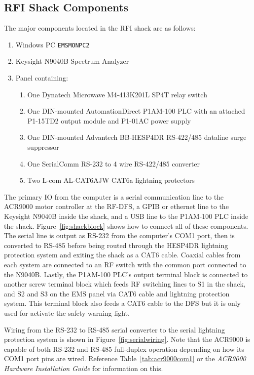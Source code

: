 \documentclass[titlepage]{article}
\begin{document}
\subsection{RFI Shack Components}\label{sec:higshack}
The major components located in the RFI shack are as follows:
\begin{enumerate}
  \item Windows PC \verb|EMSMONPC2|
  \item Keysight N9040B Spectrum Analyzer
  \item Panel containing:
  \begin{enumerate}
    \item One Dynatech Microwave M4-413K201L SP4T relay switch
    \item One DIN-mounted AutomationDirect P1AM-100 PLC with an attached P1-15TD2 output module and P1-01AC power supply
    \item One DIN-mounted Advantech BB-HESP4DR RS-422/485 dataline surge suppressor
    \item One SerialComm RS-232 to 4 wire RS-422/485 converter
    \item Two L-com AL-CAT6AJW CAT6a lightning protectors
  \end{enumerate}
\end{enumerate}

The primary IO from the computer is a serial communication line to the ACR9000 motor controller at the RF-DFS, a GPIB or ethernet line to the Keysight N9040B inside the shack, and a USB line to the P1AM-100 PLC inside the shack. Figure~\ref{fig:shackblock} shows how to connect all of these components. The serial line is output as RS-232 from the computer's COM1 port, then is converted to RS-485 before being routed through the HESP4DR lightning protection system and exiting the shack as a CAT6 cable. Coaxial cables from each system are connected to an RF switch with the common port connected to the N9040B. Lastly, the P1AM-100 PLC's output terminal block is connected to another screw terminal block which feeds RF switching lines to S1 in the shack, and S2 and S3 on the EMS panel via CAT6 cable and lightning protection system. This terminal block also feeds a CAT6 cable to the DFS but it is only used for activate the safety warning light.

Wiring from the RS-232 to RS-485 serial converter to the serial lightning protection system is shown in Figure~\ref{fig:serialwiring}. Note that the ACR9000 is capable of both RS-232 and RS-485 full-duplex operation depending on how its COM1 port pins are wired. Reference Table~\ref{tab:acr9000com1} or the \textit{ACR9000 Hardware Installation Guide} for information on this.
\end{document}
